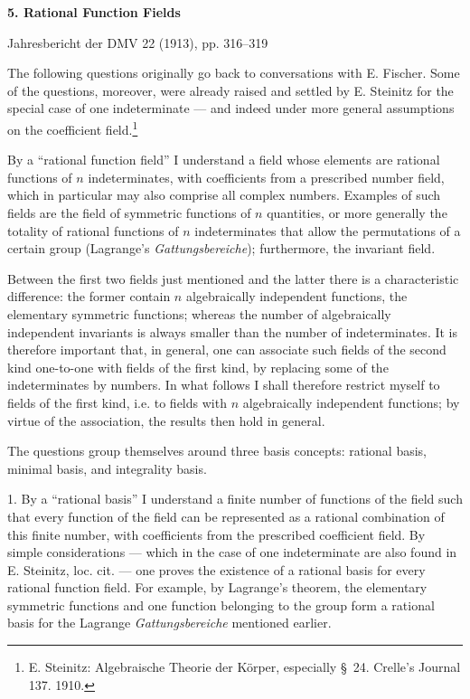\documentclass[11pt]{article}
\begin{document}
\providecommand{\Kfield}{\mathfrak{K}}
\providecommand{\Ssys}{\mathfrak{S}}
\providecommand{\Mfield}{\mathfrak{M}}
\providecommand{\tq}{\tau}
\providecommand{\ds}{\displaystyle}

\begin{center}
{\Large\bfseries 5. Rational Function Fields}\par
\vspace{1.2em}
Jahresbericht der DMV 22 (1913), pp. 316--319
\end{center}

\vspace{2em}

The following questions originally go back to conversations with E. Fischer. Some of the questions, moreover, were already raised and settled by E. Steinitz for the special case of one indeterminate --- and indeed under more general assumptions on the coefficient field.\footnote{E. Steinitz: Algebraische Theorie der Körper, especially \S\ 24. Crelle's Journal 137. 1910.}

By a ``rational function field'' I understand a field whose elements are rational functions of $n$ indeterminates, with coefficients from a prescribed number field, which in particular may also comprise all complex numbers. Examples of such fields are the field of symmetric functions of $n$ quantities, or more generally the totality of rational functions of $n$ indeterminates that allow the permutations of a certain group (Lagrange's \emph{Gattungsbereiche}); furthermore, the invariant field.

Between the first two fields just mentioned and the latter there is a characteristic difference: the former contain $n$ algebraically independent functions, the elementary symmetric functions; whereas the number of algebraically independent invariants is always smaller than the number of indeterminates. It is therefore important that, in general, one can associate such fields of the second kind one-to-one with fields of the first kind, by replacing some of the indeterminates by numbers. In what follows I shall therefore restrict myself to fields of the first kind, i.e. to fields with $n$ algebraically independent functions; by virtue of the association, the results then hold in general.

The questions group themselves around three basis concepts: rational basis, minimal basis, and integrality basis.

1. By a ``rational basis'' I understand a finite number of functions of the field such that every function of the field can be represented as a rational combination of this finite number, with coefficients from the prescribed coefficient field. By simple considerations --- which in the case of one indeterminate are also found in E. Steinitz, loc. cit. --- one proves the existence of a rational basis for every rational function field. For example, by Lagrange's theorem, the elementary symmetric functions and one function belonging to the group form a rational basis for the Lagrange \emph{Gattungsbereiche} mentioned earlier.
\end{document}
